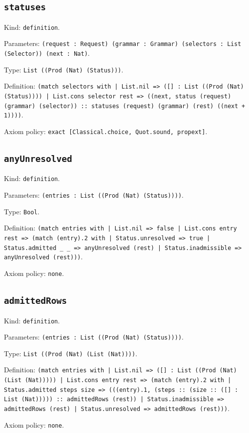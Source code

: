 \documentclass[11pt]{article}
\begin{document}
\subsection*{\texttt{statuses}}
\noindent Kind: \texttt{definition}.\par
\noindent Parameters: \texttt{(request : Request) (grammar : Grammar) (selectors : List (Selector)) (next : Nat)}.\par
\noindent Type: \texttt{List ((Prod (Nat) (Status)))}.\par
\noindent Definition: \texttt{(match selectors with | List.nil => ([] : List ((Prod (Nat) (Status)))) | List.cons selector rest => ((next, status (request) (grammar) (selector)) :: statuses (request) (grammar) (rest) ((next + 1))))}.\par
\noindent Axiom policy: \texttt{exact [Classical.choice, Quot.sound, propext]}.\par
\subsection*{\texttt{anyUnresolved}}
\noindent Kind: \texttt{definition}.\par
\noindent Parameters: \texttt{(entries : List ((Prod (Nat) (Status))))}.\par
\noindent Type: \texttt{Bool}.\par
\noindent Definition: \texttt{(match entries with | List.nil => false | List.cons entry rest => (match (entry).2 with | Status.unresolved => true | Status.admitted \_ \_ => anyUnresolved (rest) | Status.inadmissible => anyUnresolved (rest)))}.\par
\noindent Axiom policy: \texttt{none}.\par
\subsection*{\texttt{admittedRows}}
\noindent Kind: \texttt{definition}.\par
\noindent Parameters: \texttt{(entries : List ((Prod (Nat) (Status))))}.\par
\noindent Type: \texttt{List ((Prod (Nat) (List (Nat))))}.\par
\noindent Definition: \texttt{(match entries with | List.nil => ([] : List ((Prod (Nat) (List (Nat))))) | List.cons entry rest => (match (entry).2 with | Status.admitted steps size => (((entry).1, (steps :: (size :: ([] : List (Nat))))) :: admittedRows (rest)) | Status.inadmissible => admittedRows (rest) | Status.unresolved => admittedRows (rest)))}.\par
\noindent Axiom policy: \texttt{none}.\par
\end{document}
